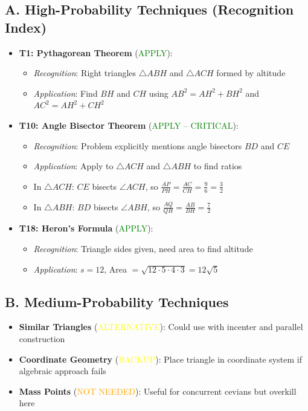 \documentclass[12pt]{article}
\begin{document}
\begin{conversionbox}
\subsection*{A. High-Probability Techniques (Recognition Index)}
\begin{itemize}[leftmargin=*]
    \item \textbf{T1: Pythagorean Theorem} (\textcolor{green}{APPLY}): 
    \begin{itemize}
        \item \textit{Recognition}: Right triangles $\triangle ABH$ and $\triangle ACH$ formed by altitude
        \item \textit{Application}: Find $BH$ and $CH$ using $AB^2 = AH^2 + BH^2$ and $AC^2 = AH^2 + CH^2$
    \end{itemize}
    \item \textbf{T10: Angle Bisector Theorem} (\textcolor{green}{APPLY -- CRITICAL}):
    \begin{itemize}
        \item \textit{Recognition}: Problem explicitly mentions angle bisectors $BD$ and $CE$
        \item \textit{Application}: Apply to $\triangle ACH$ and $\triangle ABH$ to find ratios
        \item In $\triangle ACH$: $CE$ bisects $\angle ACH$, so $\frac{AP}{PH} = \frac{AC}{CH} = \frac{9}{6} = \frac{3}{2}$
        \item In $\triangle ABH$: $BD$ bisects $\angle ABH$, so $\frac{AQ}{QH} = \frac{AB}{BH} = \frac{7}{2}$
    \end{itemize}
    \item \textbf{T18: Heron's Formula} (\textcolor{green}{APPLY}):
    \begin{itemize}
        \item \textit{Recognition}: Triangle sides given, need area to find altitude
        \item \textit{Application}: $s = 12$, Area $= \sqrt{12 \cdot 5 \cdot 4 \cdot 3} = 12\sqrt{5}$
    \end{itemize}
\end{itemize}

\subsection*{B. Medium-Probability Techniques}
\begin{itemize}[leftmargin=*]
    \item \textbf{Similar Triangles} (\textcolor{yellow}{ALTERNATIVE}): Could use with incenter and parallel construction
    \item \textbf{Coordinate Geometry} (\textcolor{yellow}{BACKUP}): Place triangle in coordinate system if algebraic approach fails
    \item \textbf{Mass Points} (\textcolor{orange}{NOT NEEDED}): Useful for concurrent cevians but overkill here
\end{itemize}


\end{conversionbox}
\end{document}

